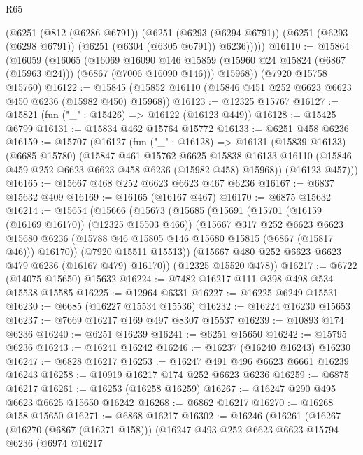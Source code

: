 \begin{lexlean}{R65}
\begin{coremodule}
{      (@6251
        (@812 (@6286 @6791))
        (@6251
          (@6293 (@6294 @6791))
          (@6251 (@6293 (@6298 @6791)) (@6251 (@6304 (@6305 @6791)) @6236)))))
@16110 := @15864
    (@16059
      (@16065
        (@16069
          @16090
          @146
          @15859
          (@15960 @24 @15824 (@6867 (@15963 @24)))
          (@6867 (@7006 @16090 @146)))
        @15968))
    (@7920 @15758 @15760)
@16122 := @15845 (@15852 @16110 (@15846 @451 @252 @6623 @6623 @450 @6236 (@15982 @450) @15968))
@16123 := @12325 @15767
@16127 := @15821 (fun ("_" : @15426) => @16122 (@16123 @449))
@16128 := @15425 @6799
@16131 := @15834 @462 @15764 @15772
@16133 := @6251 @458 @6236
@16159 := @15707
    (@16127
      (fun ("_" : @16128) =>
      @16131
        (@15839 @16133)
        (@6685 @15780)
        (@15847
          @461
          @15762
          @6625
          @15838
          @16133
          @16110
          (@15846 @459 @252 @6623 @6623 @458 @6236 (@15982 @458) @15968))
        (@16123 @457)))
@16165 := @15667 @468 @252 @6623 @6623 @467 @6236
@16167 := @6837 @15632 @409
@16169 := @16165 (@16167 @467)
@16170 := @6875 @15632
@16214 := @15654
    (@15666
      (@15673
        (@15685
          (@15691
            (@15701 (@16159 (@16169 @16170)) (@12325 @15503 @466))
            (@15667
              @317
              @252
              @6623
              @6623
              @15680
              @6236
              (@15788 @46 @15805 @146 @15680 @15815 (@6867 (@15817 @46)))
              @16170))
          (@7920 @15511 @15513))
        (@15667 @480 @252 @6623 @6623 @479 @6236 (@16167 @479) @16170))
      (@12325 @15520 @478))
@16217 := @6722 (@14075 @15650) @15632
@16224 := @7482 @16217 @111 @398 @498 @534 @15538 @15585
@16225 := @12964 @6331
@16227 := @16225 @6249 @15531
@16230 := @6685 (@16227 @15534 @15536)
@16232 := @16224 @16230 @15653
@16237 := @7669 @16217 @169 @497 @8307 @15537
@16239 := @10893 @174 @6236
@16240 := @6251 @16239
@16241 := @6251 @15650
@16242 := @15795 @6236
@16243 := @16241 @16242
@16246 := @16237 (@16240 @16243) @16230
@16247 := @6828 @16217
@16253 := @16247 @491 @496 @6623 @6661 @16239 @16243
@16258 := @10919 @16217 @174 @252 @6623 @6236
@16259 := @6875 @16217
@16261 := @16253 (@16258 @16259)
@16267 := @16247 @290 @495 @6623 @6625 @15650 @16242
@16268 := @6862 @16217
@16270 := @16268 @158 @15650
@16271 := @6868 @16217
@16302 := @16246
    (@16261
      (@16267
        (@16270 (@6867 (@16271 @158)))
        (@16247
          @493
          @252
          @6623
          @6623
          @15794
          @6236
          (@6974
            @16217
}
\end{coremodule}
\end{lexlean}
